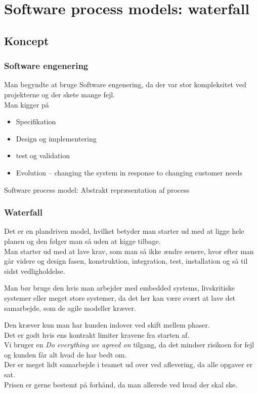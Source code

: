 \documentclass[11pt,a4paper]{article}
\begin{document}
\section{Software process models: waterfall}
\subsection*{Koncept}
\subsubsection*{Software engenering}
Man begyndte at bruge Software engenering, da der var stor kompleksitet ved projekterne og der skete mange fejl.\\
Man kigger på 
\begin{itemize}
\item Specifikation
\item Design og implementering
\item test og validation
\item Evolution – changing the system in response to changing customer needs
\end{itemize}
Software process model: Abstrakt repræsentation af process

\subsubsection*{Waterfall}
Det er en plandriven model, hvilket betyder man starter ud med at ligge hele planen og den følger man så uden at kigge tilbage.\\
Man starter ud med at lave krav, som man så ikke ændre senere, hvor efter man går videre og design fasen, konstruktion, integration, test, installation og så til sidst vedligholdelse.

Man bør bruge den hvis man arbejder med embedded systems, livskritiske systemer eller meget store systemer, da det her kan være svært at lave det samarbejde, som de agile modeller kræver.

Den kræver kun man har kunden indover ved skift mellem phaser.\\
Det er godt hvis ens kontrakt limiter kravene fra starten af.\\
Vi bruger en \textit{Do everything we agreed on} tilgang, da det mindser risikoen for fejl og kunden får alt hvad de har bedt om.\\
Der er meget lidt samarbejde i teamet ud over ved aflevering, da alle opgaver er sat.\\
Prisen er gerne bestemt på forhånd, da man allerede ved hvad der skal ske.
\end{document}
